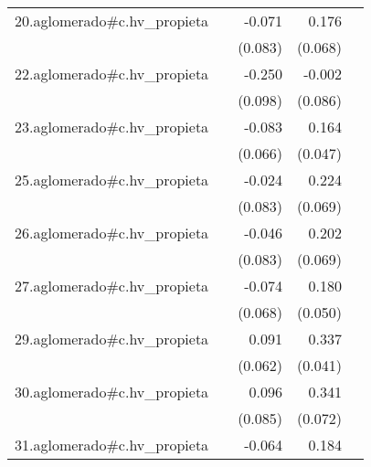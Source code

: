 {\begin{longtable}{l*{4}{D{.}{.}{-1}}}
\addlinespace
20.aglomerado#c.hv\_propieta&                     &      -0.071         &       0.176\sym{**} &                     \\
            &                     &     (0.083)         &     (0.068)         &                     \\
\addlinespace
22.aglomerado#c.hv\_propieta&                     &      -0.250\sym{*}  &      -0.002         &                     \\
            &                     &     (0.098)         &     (0.086)         &                     \\
\addlinespace
23.aglomerado#c.hv\_propieta&                     &      -0.083         &       0.164\sym{***}&                     \\
            &                     &     (0.066)         &     (0.047)         &                     \\
\addlinespace
25.aglomerado#c.hv\_propieta&                     &      -0.024         &       0.224\sym{**} &                     \\
            &                     &     (0.083)         &     (0.069)         &                     \\
\addlinespace
26.aglomerado#c.hv\_propieta&                     &      -0.046         &       0.202\sym{**} &                     \\
            &                     &     (0.083)         &     (0.069)         &                     \\
\addlinespace
27.aglomerado#c.hv\_propieta&                     &      -0.074         &       0.180\sym{***}&                     \\
            &                     &     (0.068)         &     (0.050)         &                     \\
\addlinespace
29.aglomerado#c.hv\_propieta&                     &       0.091         &       0.337\sym{***}&                     \\
            &                     &     (0.062)         &     (0.041)         &                     \\
\addlinespace
30.aglomerado#c.hv\_propieta&                     &       0.096         &       0.341\sym{***}&                     \\
            &                     &     (0.085)         &     (0.072)         &                     \\
\addlinespace
31.aglomerado#c.hv\_propieta&                     &      -0.064         &       0.184\sym{*}  &                     \\

\end{longtable}}
